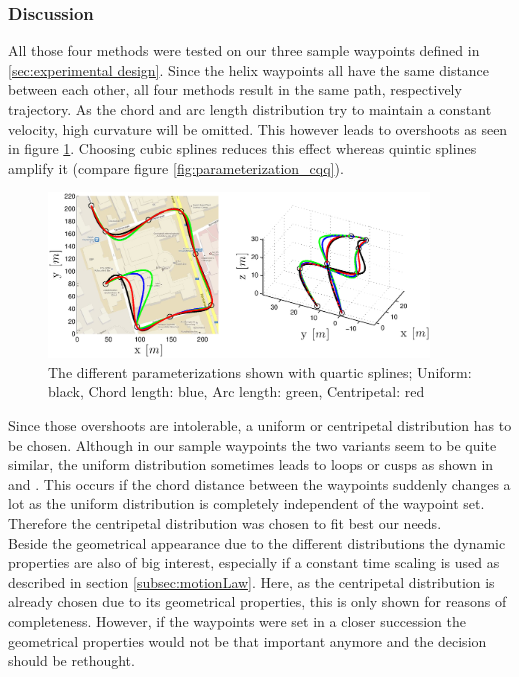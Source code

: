 \subsubsection{Discussion}


All those four methods were tested on our three sample waypoints defined in \ref{sec:experimental design}. Since the helix waypoints all have the same distance between each other, all four methods result in the same path, respectively trajectory. As the chord and arc length distribution try to maintain a constant velocity, high curvature will be omitted. This however leads to overshoots as seen in figure \ref{fig:parameterizations4_road_agile}. Choosing cubic splines reduces this effect whereas quintic splines amplify it (compare figure \ref{fig:parameterization_cqq}).

\begin{figure}[H]
	\centering
    \includegraphics[width = 0.9\textwidth]{graphics/Parameterizations4_road_agile.eps}
  \caption{The different parameterizations shown with quartic splines; Uniform: black, Chord length: blue, Arc length: green, Centripetal: red}
  \label{fig:parameterizations4_road_agile}
\end{figure}

Since those overshoots are intolerable, a uniform or centripetal distribution has to be chosen. Although in our sample waypoints the two variants seem to be quite similar, the uniform distribution sometimes leads to  loops or cusps as shown in \cite{lee} and \cite{haron}. This occurs if the chord distance between the waypoints suddenly changes a lot as the uniform distribution is completely independent of the waypoint set. Therefore the centripetal distribution was chosen to fit best our needs.
\\
Beside the geometrical appearance due to the different distributions the dynamic properties are also of big interest, especially if a constant time scaling is used as described in section \ref{subsec:motionLaw}. Here, as the centripetal distribution is already chosen due to its geometrical properties, this is only shown for reasons of completeness. However, if the waypoints were set in a closer succession the geometrical properties would not be that important anymore and the decision should be rethought.

